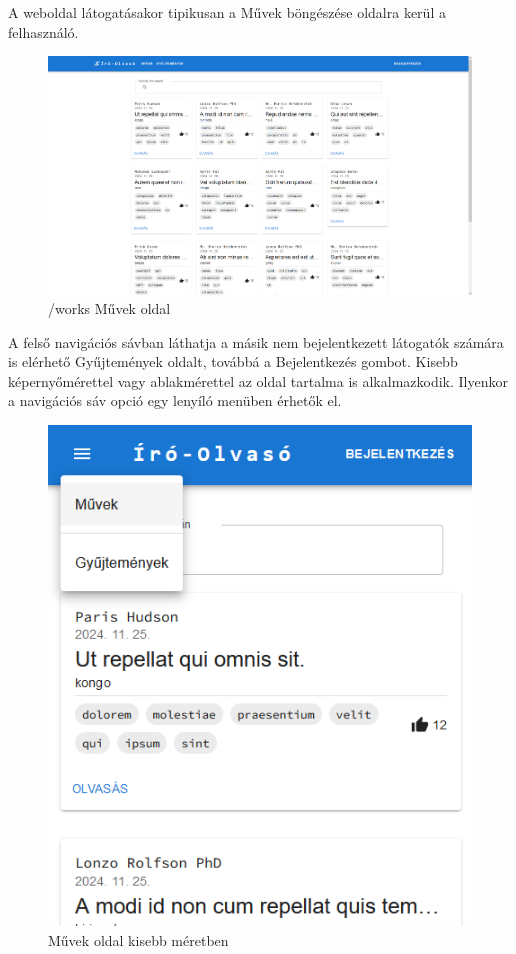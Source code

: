 A weboldal látogatásakor tipikusan a Művek böngészése oldalra kerül a felhasználó.

\begin{figure}[H]
    \centering
    \includegraphics[scale=0.3]{./figures/works-page.png}
    \caption{/works Művek oldal}
    \label{fig:works-page}
\end{figure}

A felső navigációs sávban láthatja a másik nem bejelentkezett látogatók
számára is elérhető Gyűjtemények oldalt, továbbá a Bejelentkezés gombot.
Kisebb képernyőmérettel vagy ablakmérettel az oldal tartalma is alkalmazkodik.
Ilyenkor a navigációs sáv opció egy lenyíló menüben érhetők el.

\begin{figure}[H]
    \centering
    \includegraphics[scale=0.5]{./figures/navbar-small.png}
    \caption{Művek oldal kisebb méretben}
    \label{fig:navbar-small}
\end{figure}

